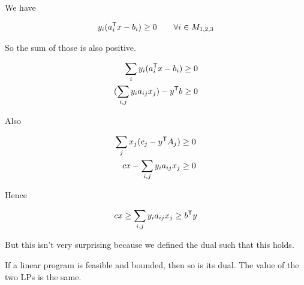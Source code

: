 \begin{pr} We have

\[y_i({a}^\text{\upshape \sffamily T}_ix-b_i) \geq 0 \qquad \forall i\in M_{1,2,3}\]


So the sum of those is also positive.

\begin{align*}
\sum_i y_i({a}^\text{\upshape \sffamily T}_ix-b_i) &\geq 0\\
(\sum_{i,j}y_ia_{ij}x_j)-{y}^\text{\upshape \sffamily T}b &\geq 0
\end{align*}

Also 

\begin{align*}
\sum_j x_j(c_j-{y}^\text{\upshape \sffamily T}A_j) & \geq 0\\
cx - \sum_{i,j} y_i a_{ij} x_j &\geq 0
\end{align*}

Hence

\[cx \geq \sum_{i,j} y_i a_{ij} x_j \geq {b}^\text{\upshape \sffamily T} y\]

But this isn't very surprising because we defined the dual such that this holds.
\end{pr}

\begin{thm}\label{thm:strongDuality} If a linear program is feasible and bounded, then so is its dual. The value of the two LPs is the same. \end{thm}


